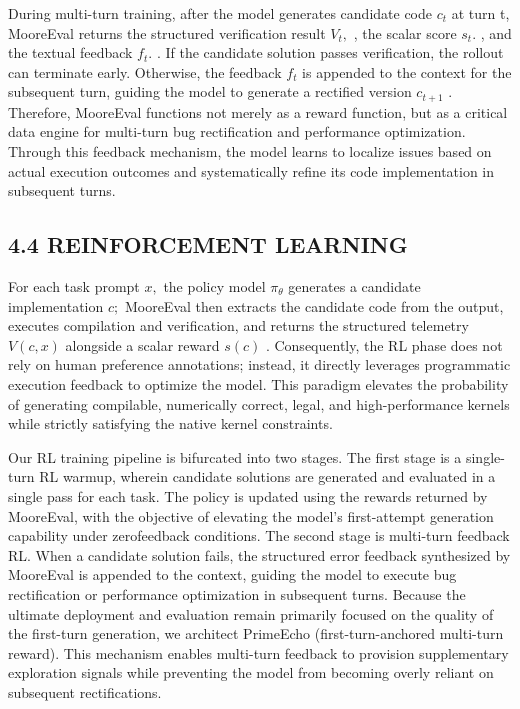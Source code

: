 \documentclass[
  10
]{article}
\begin{document}
During multi-turn training, after the model generates candidate code
\(c _ { t }\) at turn t, MooreEval returns the structured verification
result \(V _ { t } ,\) , the scalar score \(s _ { t } .\) , and the
textual feedback \(f _ { t } .\) . If the candidate solution passes
verification, the rollout can terminate early. Otherwise, the feedback
\(f _ { t }\) is appended to the context for the subsequent turn,
guiding the model to generate a rectified version \(c _ { t + 1 }\) .
Therefore, MooreEval functions not merely as a reward function, but as a
critical data engine for multi-turn bug rectification and performance
optimization. Through this feedback mechanism, the model learns to
localize issues based on actual execution outcomes and systematically
refine its code implementation in subsequent turns.

\subsection{4.4 REINFORCEMENT LEARNING}\label{reinforcement-learning}

For each task prompt \(x ,\) the policy model \(\pi _ { \theta }\)
generates a candidate implementation \(c ;\) MooreEval then extracts the
candidate code from the output, executes compilation and verification,
and returns the structured telemetry \(V ( c , x )\) alongside a scalar
reward \(s ( c )\) . Consequently, the RL phase does not rely on human
preference annotations; instead, it directly leverages programmatic
execution feedback to optimize the model. This paradigm elevates the
probability of generating compilable, numerically correct, legal, and
high-performance kernels while strictly satisfying the native kernel
constraints.

Our RL training pipeline is bifurcated into two stages. The first stage
is a single-turn RL warmup, wherein candidate solutions are generated
and evaluated in a single pass for each task. The policy is updated
using the rewards returned by MooreEval, with the objective of elevating
the model's first-attempt generation capability under zerofeedback
conditions. The second stage is multi-turn feedback RL. When a candidate
solution fails, the structured error feedback synthesized by MooreEval
is appended to the context, guiding the model to execute bug
rectification or performance optimization in subsequent turns. Because
the ultimate deployment and evaluation remain primarily focused on the
quality of the first-turn generation, we architect PrimeEcho
(first-turn-anchored multi-turn reward). This mechanism enables
multi-turn feedback to provision supplementary exploration signals while
preventing the model from becoming overly reliant on subsequent
rectifications.
\end{document}
